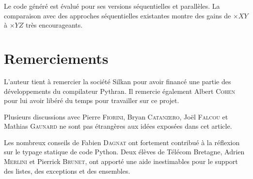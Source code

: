 \documentclass[renpar]{compas2013}
\begin{document}
Le code généré est évalué pour ses versions séquentielles et parallèles. La
comparaison avec des approches séquentielles existantes montre des gains
de $\times XY$ à $\times YZ$ très encourageants.



\section{Remerciements}

L'auteur tient à remercier la société Silkan pour avoir financé une partie des
développements du compilateur Pythran. Il remercie également Albert
\textsc{Cohen} pour lui avoir libéré du temps pour travailler sur ce projet.

Plusieurs discussions avec Pierre \textsc{Fiorini}, Bryan
\textsc{Catanzero}, Joël \textsc{Falcou} et Mathias \textsc{Gaunard} ne
sont pas étrangères aux idées exposées dans cet article.

Les nombreux conseils de Fabien \textsc{Dagnat} ont fortement contribué à
la réflexion sur le typage statique de code Python. Deux élèves de Télécom
Bretagne, Adrien \textsc{Merlini} et Pierrick \textsc{Brunet}, ont apporté
une aide inestimables pour le support des listes, des exceptions et des
ensembles.


\end{document}
